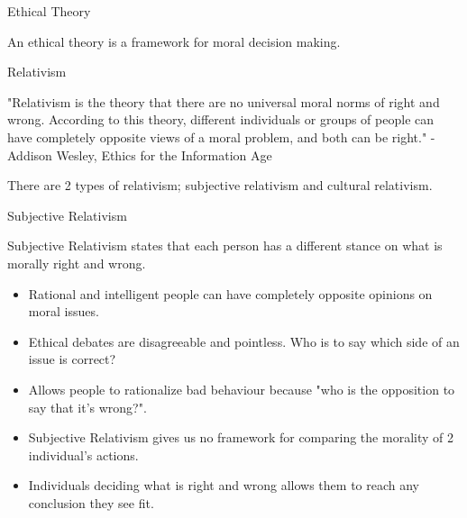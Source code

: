 \documentclass[]{../../DefinitionFormat}
\begin{document}
\begin{definition}{Ethical Theory}
	\par An ethical theory is a framework for moral decision making.
\end{definition}

\begin{definition}{Relativism}
	\begin{summary}
		"Relativism is the theory that there are no universal moral norms of right and wrong.
		According to this theory, different individuals or groups of people can have completely
		opposite views of a moral problem, and both can be right." - Addison Wesley, Ethics for the Information Age
	\end{summary}
	\par There are 2 types of relativism; subjective relativism and cultural relativism.
\end{definition}

\begin{definition}{Subjective Relativism}
	\par Subjective Relativism states that each person has a different stance on what is morally right and wrong.
	
	\renewcommand{\labelitemi}{$+$}
	\begin{itemize}
		\item Rational and intelligent people can have completely opposite opinions on moral issues.
		\item Ethical debates are disagreeable and pointless. Who is to say which side of an issue is correct?
	\end{itemize}
	\renewcommand{\labelitemi}{$-$}
	\begin{itemize}
		\item Allows people to rationalize bad behaviour because "who is the opposition to say that it's wrong?".
		\item Subjective Relativism gives us no framework for comparing the morality of 2 individual's actions.
		\item Individuals deciding what is right and wrong allows them to reach any conclusion they see fit.
	\end{itemize}
\end{definition}
\end{document}
